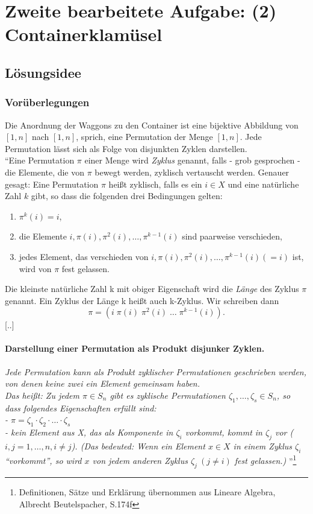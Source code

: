 \section{Zweite bearbeitete Aufgabe: (2) Containerklamüsel}
\subsection{Lösungsidee}
\subsubsection{Vorüberlegungen}
Die Anordnung der Waggons zu den Container ist eine bijektive Abbildung von $[1,n]$ nach $[1,n]$, sprich, eine Permutation der Menge $[1,n]$.
Jede Permutation lässt sich als Folge von disjunkten Zyklen darstellen. \\ %
``Eine Permutation $\pi$ einer Menge wird \emph{Zyklus} genannt, falls - grob gesprochen - die Elemente, die von $\pi$ bewegt werden,
zyklisch vertauscht werden. Genauer gesagt: Eine Permutation $\pi$ heißt zyklisch,
falls es ein $ i \in X$ und eine natürliche Zahl $k$ gibt, so dass die folgenden drei Bedingungen gelten:
\begin{enumerate}
 \item $\pi^k(i) = i$,
 \item die Elemente $i,\pi(i),\pi^2(i),\dots,\pi^{k-1}(i)$ sind paarweise verschieden,
 \item jedes Element, das verschieden von $i,\pi(i),\pi^2(i),\dots,\pi^{k-1}(i) (=i)$ ist, wird von $\pi$ fest gelassen.
\end{enumerate}
Die kleinste natürliche Zahl k mit obiger Eigenschaft wird die \emph{Länge} des Zyklus $\pi$ genannt.
Ein Zyklus der Länge k heißt auch k-Zyklus. Wir schreiben dann \[\pi=(i\;\pi(i)\;\pi^2(i) \; \dots \;\pi^{k-1}(i)).\]
[..]
\paragraph{Darstellung einer Permutation als Produkt disjunker Zyklen.}
\emph{Jede Permutation kann als Produkt zyklischer Permutationen geschrieben werden, von denen keine zwei ein Element gemeinsam haben.}\\
\emph{Das heißt: Zu jedem $\pi \in S_n$ gibt es zyklische Permutationen $\zeta_1,\dots,\zeta_s \in S_n$,
so dass folgendes Eigenschaften erfüllt sind: \\
 - $\pi=\zeta_1\cdot \zeta_2 \cdot \ldots \cdot \zeta_s$ \\
 - kein Element aus X, das als Komponente in $\zeta_i$ vorkommt, kommt in $\zeta_j$ vor ($i,j=1,\dots,n, i \neq j$).
(Das bedeuted: Wenn ein Element $x \in X$ in einem Zyklus $\zeta_i$ ``vorkommt'',
 so wird $x$ von jedem anderen Zyklus $\zeta_j \: (j \neq i)$ fest gelassen.)
}''\footnote{Definitionen, Sätze und Erklärung übernommen aus Lineare Algebra, Albrecht Beutelspacher, S.174f}\\


